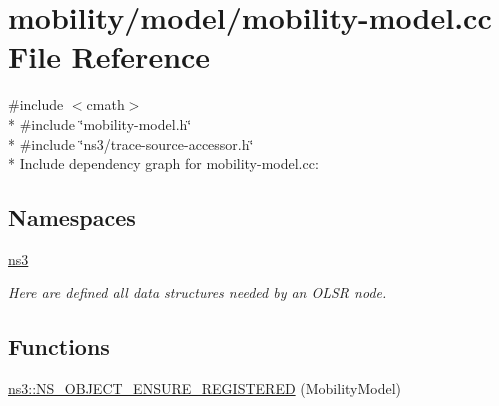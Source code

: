 \hypertarget{mobility-model_8cc}{}\section{mobility/model/mobility-\/model.cc File Reference}
\label{mobility-model_8cc}
{\ttfamily \#include $<$cmath$>$}\\*
{\ttfamily \#include \char`\"{}mobility-\/model.\+h\char`\"{}}\\*
{\ttfamily \#include \char`\"{}ns3/trace-\/source-\/accessor.\+h\char`\"{}}\\*
Include dependency graph for mobility-\/model.cc\+:
\subsection*{Namespaces}
\begin{DoxyCompactItemize}
\item 
 \hyperlink{namespacens3}{ns3}
\begin{DoxyCompactList}\small\item\em Here are defined all data structures needed by an O\+L\+SR node. \end{DoxyCompactList}\end{DoxyCompactItemize}
\subsection*{Functions}
\begin{DoxyCompactItemize}
\item 
\hyperlink{namespacens3_afb7190b350c862f468aadd0957bacb5a}{ns3\+::\+N\+S\+\_\+\+O\+B\+J\+E\+C\+T\+\_\+\+E\+N\+S\+U\+R\+E\+\_\+\+R\+E\+G\+I\+S\+T\+E\+R\+ED} (Mobility\+Model)
\end{DoxyCompactItemize}
